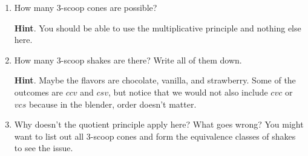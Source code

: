 \documentclass{book}
\begin{document}
\setcounter{cpjt}{119}
\addtocounter{cpjt}{-1}
\begin{activity}\label{activity-112}
\begin{enumerate}[font=\bfseries,label=(\alph*),ref=\alph*]
\item\label{task-150} \hypertarget{p-801}{}%
How many 3-scoop cones are possible?%
\par\smallskip%
\noindent\textbf{Hint}.\hypertarget{hint-78}{}\quad%
\hypertarget{p-802}{}%
You should be able to use the multiplicative principle and nothing else here.%
\item\label{task-151} \hypertarget{p-803}{}%
How many 3-scoop shakes are there?  Write all of them down.%
\par\smallskip%
\noindent\textbf{Hint}.\hypertarget{hint-79}{}\quad%
\hypertarget{p-804}{}%
Maybe the flavors are chocolate, vanilla, and strawberry.  Some of the outcomes are \(ccv\) and \(csv\), but notice that we would not also include \(cvc\) or \(vcs\) because in the blender, order doesn't matter.%
\item\label{task-152} \hypertarget{p-805}{}%
Why doesn't the quotient principle apply here?  What goes wrong?  You might want to list out all 3-scoop cones and form the equivalence classes of shakes to see the issue.%
\end{enumerate}
\end{activity}

\clearpage
\end{document}
